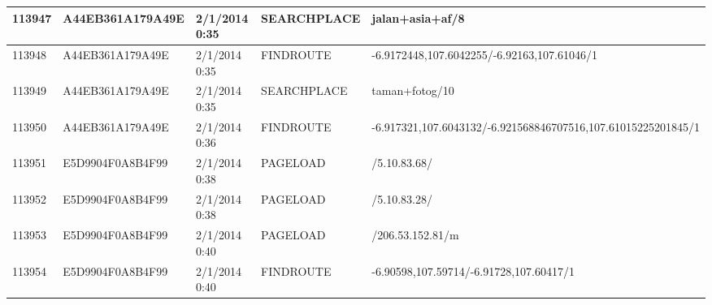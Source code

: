 \begin{longtable}{|p{1cm}|l|l|l|p{8cm}|}
113947         & A44EB361A179A49E & 2/1/2014 0:35            & SEARCHPLACE     & jalan+asia+af/8                                                                                                                                                                                                       \\ \hline
113948         & A44EB361A179A49E & 2/1/2014 0:35            & FINDROUTE       & -6.9172448,107.6042255/-6.92163,107.61046/1                                                                                                                                                                           \\ \hline
113949         & A44EB361A179A49E & 2/1/2014 0:35            & SEARCHPLACE     & taman+fotog/10                                                                                                                                                                                                        \\ \hline
113950         & A44EB361A179A49E & 2/1/2014 0:36            & FINDROUTE       & -6.917321,107.6043132/-6.921568846707516,107.61015225201845/1                                                                                                                                                         \\ \hline
113951         & E5D9904F0A8B4F99 & 2/1/2014 0:38            & PAGELOAD        & /5.10.83.68/                                                                                                                                                                                                          \\ \hline
113952         & E5D9904F0A8B4F99 & 2/1/2014 0:38            & PAGELOAD        & /5.10.83.28/                                                                                                                                                                                                          \\ \hline
113953         & E5D9904F0A8B4F99 & 2/1/2014 0:40            & PAGELOAD        & /206.53.152.81/m                                                                                                                                                                                                      \\ \hline
113954         & E5D9904F0A8B4F99 & 2/1/2014 0:40            & FINDROUTE       & -6.90598,107.59714/-6.91728,107.60417/1                                                                                                                                                                               \\ \hline

\end{longtable}
